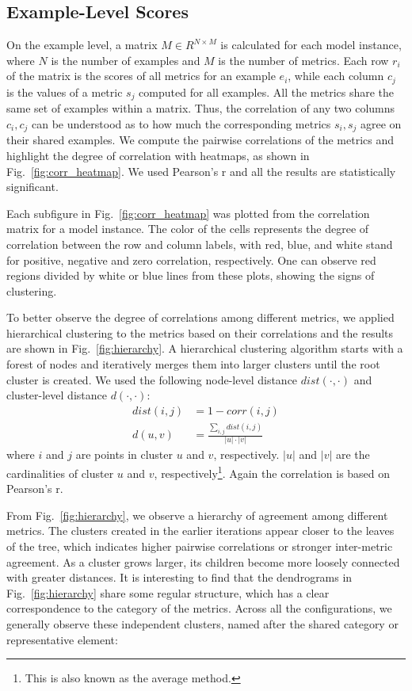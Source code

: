 \documentclass[conference]{IEEEtran}
\begin{document}
\subsection{Example-Level Scores}
On the example level, a matrix $M \in R^{N \times M}$ is calculated for each model instance, where $N$ is the number of examples and $M$ is the number of metrics.
Each row $r_i$ of the matrix is the scores of all metrics for an example $e_i$, while each column $c_j$ is the values of a metric $s_j$ computed for all examples.
All the metrics share the same set of examples within a matrix.
Thus, the correlation of any two columns $c_i, c_j$ can be understood as to how much the corresponding metrics $s_i, s_j$ agree on their shared examples.
We compute the pairwise correlations of the metrics and highlight the degree of correlation with heatmaps, as shown in Fig.~\ref{fig:corr_heatmap}.
We used Pearson's r and all the results are statistically significant.



Each subfigure in Fig.~\ref{fig:corr_heatmap} was plotted from the correlation matrix for a model instance.
The color of the cells represents the degree of correlation between the row and column labels, with red, blue, and white stand for positive, negative and zero correlation, respectively.
One can observe red regions divided by white or blue lines from these plots, showing the signs of clustering.

To better observe the degree of correlations among different metrics, we applied hierarchical clustering to the metrics based on their correlations and the results are shown in Fig.~\ref{fig:hierarchy}.
A hierarchical clustering algorithm starts with a forest of nodes and iteratively merges them into larger clusters until the root cluster is created.
We used the following node-level distance $\textit{dist}(\cdot, \cdot)$ and cluster-level distance $d(\cdot, \cdot)$:
\begin{align}
    \textit{dist}(i, j) &= 1 - \textit{corr}(i, j) \\
    d(u, v) &= \frac{\sum_{i,j}\textit{dist}(i, j)}{|u| \cdot |v|}
\end{align}
where $i$ and $j$ are points in cluster $u$ and $v$, respectively. $|u|$ and $|v|$ are the cardinalities of cluster $u$ and $v$, respectively\footnote{This is also known as the average method.}. Again the correlation is based on Pearson's r.


From Fig.~\ref{fig:hierarchy}, we observe a hierarchy of agreement among different metrics.
The clusters created in the earlier iterations appear closer to the leaves of the tree, which indicates higher pairwise correlations or stronger inter-metric agreement.
As a cluster grows larger, its children become more loosely connected with greater distances.
It is interesting to find that the dendrograms in Fig.~\ref{fig:hierarchy} share some regular structure, which has a clear correspondence to the category of the metrics. Across all the configurations, we generally observe these independent clusters, named after the shared category or representative element:
\end{document}
